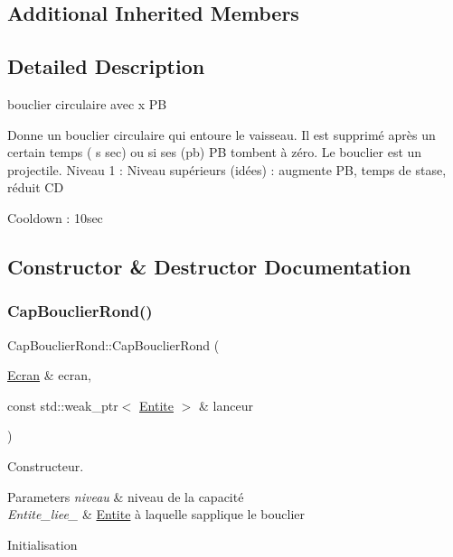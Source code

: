 \subsection*{Additional Inherited Members}


\subsection{Detailed Description}
bouclier circulaire avec x PB 

Donne un bouclier circulaire qui entoure le vaisseau. Il est supprimé après un certain temps ( s sec) ou si ses (pb) PB tombent à zéro. Le bouclier est un projectile. Niveau 1 \+: Niveau supérieurs (idées) \+: augmente PB, temps de stase, réduit CD

Cooldown \+: 10sec 

\subsection{Constructor \& Destructor Documentation}
\mbox{\label{class_cap_bouclier_rond_a371bae2937bafb1cef7e1867a93ba8a1}} 
\subsubsection{\texorpdfstring{Cap\+Bouclier\+Rond()}{CapBouclierRond()}}
{\footnotesize\ttfamily Cap\+Bouclier\+Rond\+::\+Cap\+Bouclier\+Rond (\begin{DoxyParamCaption}\item[{\mbox{\hyperlink{class_ecran}{Ecran}} \&}]{ecran,  }\item[{const std\+::weak\+\_\+ptr$<$ \mbox{\hyperlink{class_entite}{Entite}} $>$ \&}]{lanceur }\end{DoxyParamCaption})}



Constructeur. 


\begin{DoxyParams}{Parameters}
{\em niveau} & niveau de la capacité \\
\hline
{\em Entite\+\_\+liee\+\_\+} & \mbox{\hyperlink{class_entite}{Entite}} à laquelle s\textquotesingle{}applique le bouclier\\
\hline
\end{DoxyParams}
Initialisation 

